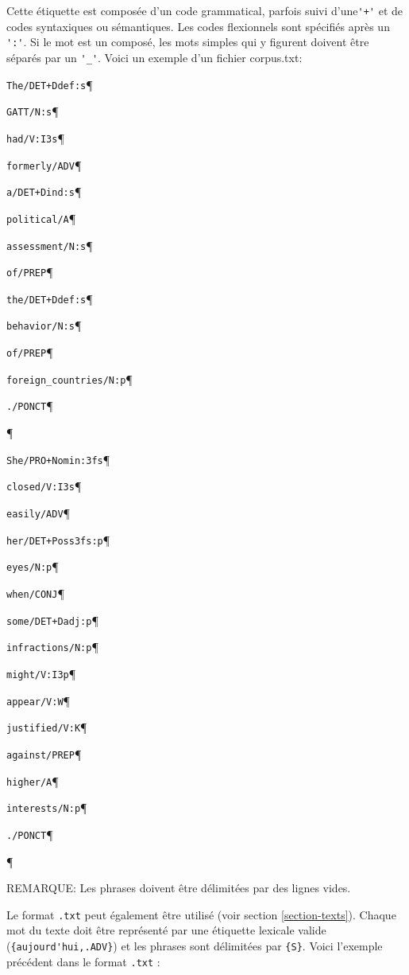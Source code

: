 Cette étiquette est composée d'un code grammatical, parfois suivi d'une\verb$'+'$ et de codes
syntaxiques ou sémantiques. Les codes flexionnels sont spécifiés après un \verb+':'+. Si le mot est
un composé, les mots simples qui y figurent doivent être séparés par un \verb+'_'+. 
Voici un exemple d'un fichier corpus.txt:

\bigskip
\verb$The/DET+Ddef:s$\P

\verb+GATT/N:s+\P

\verb+had/V:I3s+\P

\verb+formerly/ADV+\P

\verb$a/DET+Dind:s$\P

\verb+political/A+\P

\verb+assessment/N:s+\P

\verb+of/PREP+\P

\verb$the/DET+Ddef:s$\P

\verb+behavior/N:s+\P

\verb+of/PREP+\P

\verb+foreign_countries/N:p+\P

\verb+./PONCT+\P

\P

\verb$She/PRO+Nomin:3fs$\P

\verb+closed/V:I3s+\P

\verb+easily/ADV+\P

\verb$her/DET+Poss3fs:p$\P

\verb+eyes/N:p+\P

\verb+when/CONJ+\P

\verb$some/DET+Dadj:p$\P

\verb+infractions/N:p+\P

\verb+might/V:I3p+\P

\verb+appear/V:W+\P

\verb+justified/V:K+\P

\verb+against/PREP+\P

\verb+higher/A+\P

\verb+interests/N:p+\P

\verb+./PONCT+\P

\P

\bigskip
\noindent REMARQUE: Les phrases doivent être délimitées par des lignes vides.

\bigskip
Le format \verb+.txt+ peut également être utilisé (voir section \ref{section-texts}). Chaque mot du
texte doit être représenté par une étiquette lexicale valide
(\verb+{aujourd'hui,.ADV}+) et les phrases sont délimitées par
\verb+{S}+.
Voici l'exemple précédent dans le format \verb+.txt+ :

